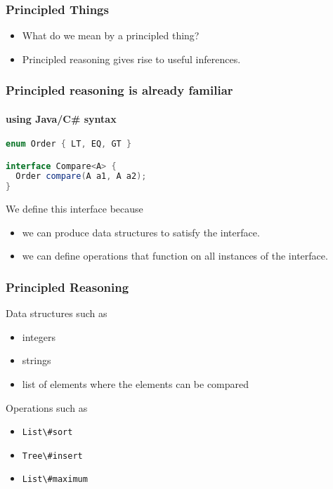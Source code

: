 \begin{frame}
\frametitle{Principled Things}
\begin{itemize}
\item<1> What do we mean by a principled thing?
\item<2> Principled reasoning gives rise to useful inferences.
\end{itemize}
\end{frame}

\begin{frame}[fragile]
\frametitle{Principled reasoning is already familiar}
\framesubtitle{using Java/C\# syntax}
\begin{lstlisting}[style=language,language=java]
enum Order { LT, EQ, GT }

interface Compare<A> {
  Order compare(A a1, A a2);
}
\end{lstlisting}
\begin{block}{We define this interface because}
\begin{itemize}
\item we can produce data structures to satisfy the interface.
\item we can define operations that function on all instances of the interface.
\end{itemize}
\end{block}
\end{frame}

\begin{frame}
\frametitle{Principled Reasoning}
\begin{block}{Data structures such as}
\begin{itemize}
\item integers
\item strings
\item list of elements where the elements can be compared
\end{itemize}
\end{block}
\begin{block}{Operations such as}
\begin{itemize}
\item \lstinline{List\#sort}
\item \lstinline{Tree\#insert}
\item \lstinline{List\#maximum}
\end{itemize}
\end{block}
\end{frame}

